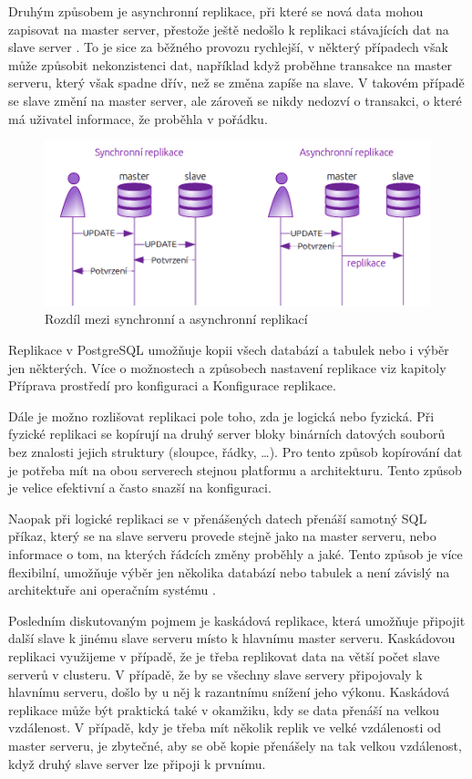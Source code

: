 Druhým způsobem je asynchronní replikace, při které se nová data mohou zapisovat na master server, přestože ještě nedošlo k replikaci stávajících dat na slave server \citep{ObeHsu2012}. To je sice za běžného provozu rychlejší, v některý případech však může způsobit nekonzistenci dat, například když proběhne transakce na master serveru, který však spadne dřív, než se změna zapíše na slave. V takovém případě se slave změní na master server, ale zároveň se nikdy nedozví o transakci, o které má uživatel informace, že proběhla v pořádku. 

        \begin{figure}[H]
          \centering
          \includegraphics[scale=1]{../../../grafy/obr/schema_asyncSync_maxiTence.png}
          \caption {Rozdíl mezi synchronní a asynchronní replikací}
        \end{figure}
Replikace v PostgreSQL umožňuje kopii všech databází a tabulek nebo i výběr jen některých. Více o možnostech a způsobech nastavení replikace viz kapitoly  Příprava prostředí pro konfiguraci a  Konfigurace replikace.

Dále je možno rozlišovat replikaci pole toho, zda je logická nebo fyzická. Při fyzické replikaci se kopírují na druhý server bloky binárních datových souborů bez znalosti jejich struktury (sloupce, řádky, …). Pro tento způsob kopírování dat je potřeba mít na obou serverech stejnou platformu a architekturu. Tento způsob je velice efektivní a často snazší na konfiguraci. 

Naopak při logické replikaci se v přenášených datech přenáší samotný SQL příkaz, který se na slave serveru provede stejně jako na master serveru, nebo informace o tom, na kterých řádcích změny proběhly a jaké. Tento způsob je více flexibilní, umožňuje výběr jen několika databází nebo tabulek a není závislý na architektuře ani operačním systému \citep{Boszormenyi2013}. 

Posledním diskutovaným pojmem je kaskádová replikace, která umožňuje připojit další slave k jinému slave serveru místo k hlavnímu master serveru. Kaskádovou replikaci využijeme v případě, že je třeba replikovat data na větší počet slave serverů v clusteru. V případě, že by se všechny slave servery připojovaly k hlavnímu serveru, došlo by u něj k razantnímu snížení jeho výkonu. Kaskádová replikace může být praktická také v okamžiku, kdy se data přenáší na velkou vzdálenost. V případě, kdy je třeba mít několik replik ve velké vzdálenosti od master serveru, je zbytečné, aby se obě kopie přenášely na tak velkou vzdálenost, když druhý slave server lze připoji k prvnímu. 

